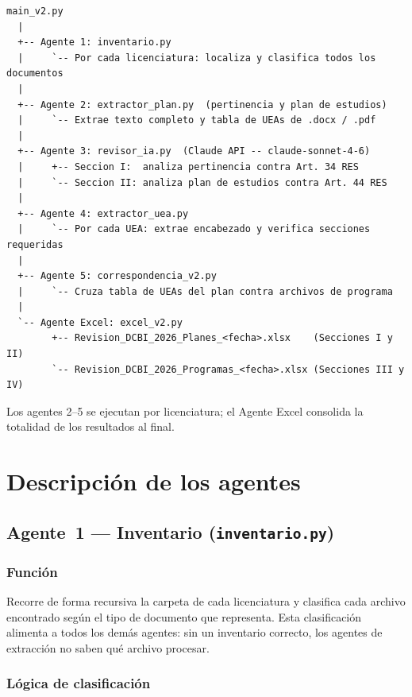 \documentclass[11pt,a4paper]{article}
\begin{document}
\begin{lstlisting}[language={}]
main_v2.py
  |
  +-- Agente 1: inventario.py
  |     `-- Por cada licenciatura: localiza y clasifica todos los documentos
  |
  +-- Agente 2: extractor_plan.py  (pertinencia y plan de estudios)
  |     `-- Extrae texto completo y tabla de UEAs de .docx / .pdf
  |
  +-- Agente 3: revisor_ia.py  (Claude API -- claude-sonnet-4-6)
  |     +-- Seccion I:  analiza pertinencia contra Art. 34 RES
  |     `-- Seccion II: analiza plan de estudios contra Art. 44 RES
  |
  +-- Agente 4: extractor_uea.py
  |     `-- Por cada UEA: extrae encabezado y verifica secciones requeridas
  |
  +-- Agente 5: correspondencia_v2.py
  |     `-- Cruza tabla de UEAs del plan contra archivos de programa
  |
  `-- Agente Excel: excel_v2.py
        +-- Revision_DCBI_2026_Planes_<fecha>.xlsx    (Secciones I y II)
        `-- Revision_DCBI_2026_Programas_<fecha>.xlsx (Secciones III y IV)
\end{lstlisting}

Los agentes 2--5 se ejecutan por licenciatura; el Agente Excel consolida la totalidad de
los resultados al final.

\section{Descripción de los agentes}

\subsection{Agente~1 --- Inventario (\texttt{inventario.py})}

\subsubsection{Función}

Recorre de forma recursiva la carpeta de cada licenciatura y clasifica cada archivo
encontrado según el tipo de documento que representa. Esta clasificación alimenta a
todos los demás agentes: sin un inventario correcto, los agentes de extracción no saben
qué archivo procesar.

\subsubsection{Lógica de clasificación}
\end{document}

